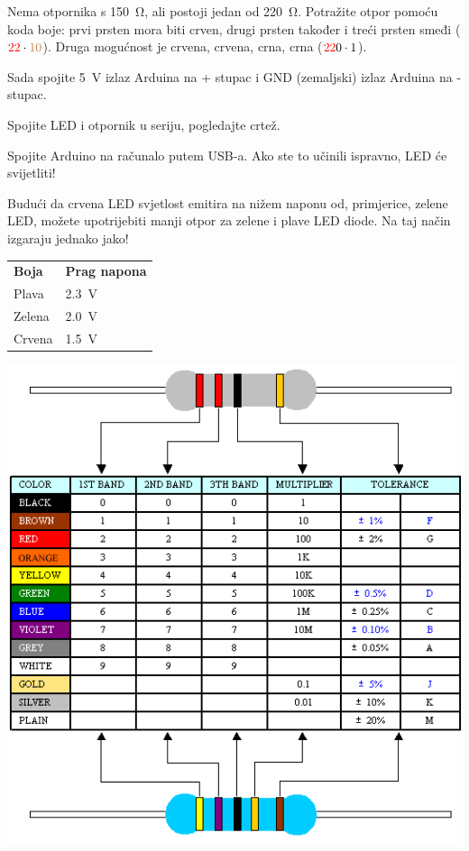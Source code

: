 \documentclass{arduino}
\begin{document}
\begin{alphalist}
\item Nema otpornika s \SI{150}{\ohm}, ali postoji jedan od \SI{220}{\ohm}. Potražite otpor pomoću koda boje: prvi prsten mora biti crven, drugi prsten također i treći prsten smeđi ($\textcolor{red}{2}\textcolor{red}{2} \cdot \textcolor{brown}{10}$). Druga mogućnost je crvena, crvena, crna, crna ($\textcolor{red}{2}\textcolor{red}{2}\textcolor{black}{0} \cdot \textcolor{black}{1}$).

\item Sada spojite \SI{5}{\volt} izlaz Arduina na + stupac i GND (zemaljski) izlaz Arduina na - stupac.

\item Spojite LED i otpornik u seriju, pogledajte crtež.

\item Spojite Arduino na računalo putem USB-a. Ako ste to učinili ispravno, LED će svijetliti!
\end{alphalist}

Budući da crvena LED svjetlost emitira na nižem naponu od, primjerice, zelene LED, možete upotrijebiti manji otpor za zelene i plave LED diode. Na taj način izgaraju jednako jako!

\begin{tabular}{ll}
\textbf{Boja} & \textbf{Prag napona} \\
Plava            & \SI{2.3}{\volt}            \\
Zelena           & \SI{2.0}{\volt}            \\
Crvena             & \SI{1.5}{\volt}            \\
\end{tabular}

\begin{minipage}[t]{\linewidth}
\includegraphics[width=0.8\linewidth]{7. Component resistor values (EN)}
\end{minipage}
\end{document}

